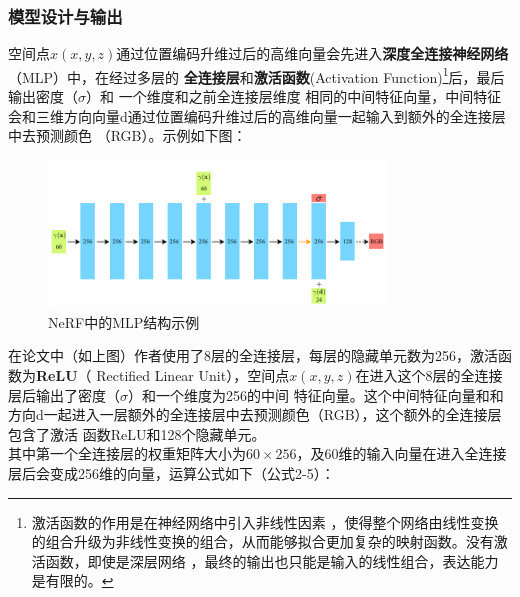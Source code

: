 \documentclass{nwputhesis}
\begin{document}
\subsubsection{模型设计与输出}
空间点$x(x,y,z)$通过位置编码升维过后的高维向量会先进入\textbf{深度全连接神经网络}（MLP）中，在经过多层的
\textbf{全连接层}和\textbf{激活函数}(Activation Function)\footnote{激活函数的作用是在神经网络中引入非线性因素
，使得整个网络由线性变换的组合升级为非线性变换的组合，从而能够拟合更加复杂的映射函数。没有激活函数，即使是深层网络
，最终的输出也只能是输入的线性组合，表达能力是有限的。}后，最后输出密度（$\sigma$）和 一个维度和之前全连接层维度
相同的中间特征向量，中间特征会和三维方向向量d通过位置编码升维过后的高维向量一起输入到额外的全连接层中去预测颜色
（RGB）。示例如下图：
\hypertarget{图2-5}{}
\begin{figure}[H]
    \centering
    \includegraphics[width=0.8\textwidth]{picture/5.png}
    \caption{NeRF中的MLP结构示例}
\end{figure}
在论文中（如上图）作者使用了8层的全连接层，每层的隐藏单元数为256，激活函数为\textbf{ReLU}（
Rectified Linear Unit），空间点$x(x,y,z)$在进入这个8层的全连接层后输出了密度（$\sigma$）和一个维度为256的中间
特征向量。这个中间特征向量和和方向d一起进入一层额外的全连接层中去预测颜色（RGB），这个额外的全连接层包含了激活
函数ReLU和128个隐藏单元。\\
\indent
其中第一个全连接层的权重矩阵大小为$60 \times 256$，及60维的输入向量在进入全连接层后会变成256维的向量，运算公式如下（公式2-5）：
\end{document}
